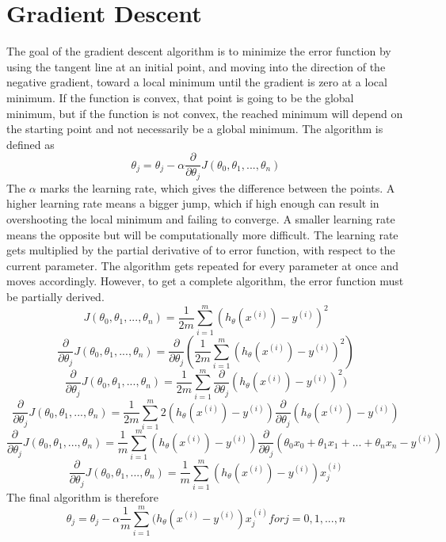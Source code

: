 \documentclass[a4paper,12pt]{article}
\begin{document}
\section{Gradient Descent}
The goal of the gradient descent algorithm is to minimize the error function by using the tangent line at an initial point, and moving into the direction of the negative gradient, toward a local minimum until the gradient is zero at a local minimum. If the function is convex, that point is going to be the global minimum, but if the function is not convex, the reached minimum will depend on the starting point and not necessarily be a global minimum. The algorithm is defined as \[\theta_j = \theta_j - \alpha \frac{\partial}{\partial\theta_j} J(\theta_0, \theta_1, ..., \theta_n)\] The \(\alpha\) marks the learning rate, which gives the difference between the points. A higher learning rate means a bigger jump, which if high enough can result in overshooting the local minimum and failing to converge. A smaller learning rate means the opposite but will be computationally more difficult. The learning rate gets multiplied by the partial derivative of to error function, with respect to the current parameter. The algorithm gets repeated for every parameter at once and moves accordingly. However, to get a complete algorithm, the error function must be partially derived. 
\[J(\theta_0, \theta_1, ..., \theta_n) = \frac{1}{2m} \sum_{i=1}^m (h_\theta(x^{(i)}) - y^{(i)})^2\]
\[\frac{\partial}{\partial\theta_j} J(\theta_0, \theta_1, ..., \theta_n) = \frac{\partial}{\partial\theta_j} (\frac{1}{2m} \sum_{i=1}^m (h_\theta(x^{(i)}) - y^{(i)})^2)\]
\[\frac{\partial}{\partial\theta_j} J(\theta_0, \theta_1, ..., \theta_n) = \frac{1}{2m} \sum_{i=1}^m \frac{\partial}{\partial\theta_j} (h_\theta(x^{(i)}) - y^{(i)})^2)\]
\[\frac{\partial}{\partial\theta_j} J(\theta_0, \theta_1, ..., \theta_n) = \frac{1}{2m} \sum_{i=1}^m 2(h_\theta(x^{(i)}) - y^{(i)}) \frac{\partial}{\partial\theta_j}(h_\theta(x^{(i)}) - y^{(i)})\]
\[\frac{\partial}{\partial\theta_j} J(\theta_0, \theta_1, ..., \theta_n) = \frac{1}{m} \sum_{i=1}^m (h_\theta(x^{(i)}) - y^{(i)})\frac{\partial}{\partial\theta_j} (\theta_0x_0+\theta_1x_1+...+\theta_nx_n-y^{(i)})\]
\[\frac{\partial}{\partial\theta_j} J(\theta_0, \theta_1, ..., \theta_n) = \frac{1}{m} \sum_{i=1}^m (h_\theta(x^{(i)}) - y^{(i)})x_j^{(i)}\]
The final algorithm is therefore
\[\theta_j = \theta_j - \alpha \frac{1}{m} \sum_{i=1}^m (h_\theta(x^{(i)} - y^{(i)})x_j^{(i)} for j = 0,1,...,n\]
\end{document}
